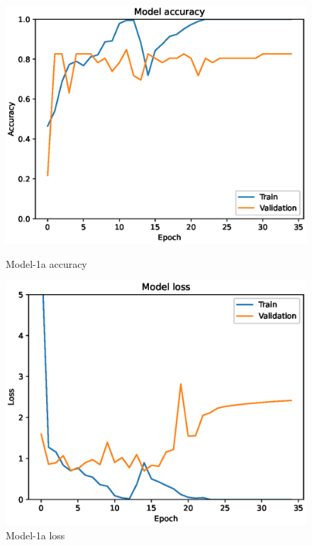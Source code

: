 \begin{figure}
    \centering
    \begin{minipage}{0.45\textwidth}
        \centering
        \includegraphics[width=\textwidth]{./fig/accuracy1a.eps}
        \caption{Model-1a accuracy}
        \label{fig:model1a_acc}
    \end{minipage}
    \begin{minipage}{0.45\textwidth}
        \centering
        \includegraphics[width=\textwidth]{./fig/loss1a.eps}
        \caption{Model-1a loss}
        \label{fig:model1a_loss}
    \end{minipage}
\end{figure}

